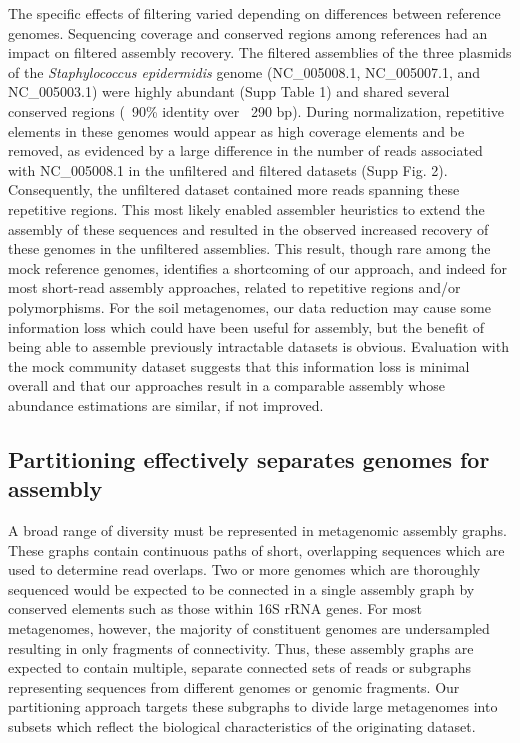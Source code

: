 \documentclass[11pt]{article} %
\begin{document}
The specific effects of filtering varied depending on differences between
reference genomes.  Sequencing coverage and conserved regions among
references had an impact on filtered assembly recovery.  The filtered
assemblies of the three plasmids of the \emph{Staphylococcus
epidermidis} genome (NC\_005008.1, NC\_005007.1, and NC\_005003.1) were
highly abundant (Supp Table 1) and shared several conserved regions
(~90\% identity over ~290 bp).  During normalization, repetitive
elements in these genomes would appear as high coverage elements and
be removed, as evidenced by a large difference in the number of reads
associated with NC\_005008.1 in the unfiltered and filtered datasets
(Supp Fig. 2). Consequently, the unfiltered dataset contained more
reads spanning these repetitive regions.  This most likely enabled
assembler heuristics to extend the assembly of these sequences and
resulted in the observed increased recovery of these genomes in the
unfiltered assemblies. This result, though rare among the mock
reference genomes, identifies a shortcoming of our approach, and
indeed for most short-read assembly approaches, related to repetitive
regions and/or polymorphisms.  For the soil metagenomes, our data
reduction may cause some information loss which could have been useful
for assembly, but the benefit of being able to assemble previously
intractable datasets is obvious.  Evaluation with the mock community
dataset suggests that this information loss is minimal overall and
that our approaches result in a comparable assembly whose abundance
estimations are similar, if not improved.

\subsection{Partitioning effectively separates genomes for assembly}

A broad range of diversity must be represented in metagenomic assembly
graphs.  These graphs contain continuous paths of short, overlapping
sequences which are used to determine read overlaps.  Two or more
genomes which are thoroughly sequenced would be expected to be
connected in a single assembly graph by conserved elements such as
those within 16S rRNA genes.  For most metagenomes, however, the
majority of constituent genomes are undersampled resulting in only
fragments of connectivity.  Thus, these assembly graphs are expected
to contain multiple, separate connected sets of reads or subgraphs
representing sequences from different genomes or genomic fragments.
Our partitioning approach targets these subgraphs to divide large
metagenomes into subsets which reflect the biological characteristics
of the originating dataset.
\end{document}
